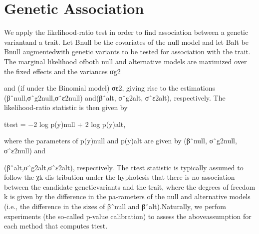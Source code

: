 \section{Genetic Association}

We apply the likelihood-ratio test in order to find association between a genetic variantand a trait. Let Bnull be the covariates of the null model and let Balt be Bnull augmentedwith genetic variants to be tested for association with the trait. The marginal likelihood ofboth null and alternative models are maximized over the fixed effects and the variances σg2

and (if under the Binomial model) σε2, giving rise to the estimations (βˆnull,σˆg2null,σˆε2null) and(βˆalt, σˆg2alt, σˆε2alt), respectively. The likelihood-ratio statistic is then given by
\begin{*align}
ttest = −2 log p(y)null + 2 log p(y)alt,
\end{*align}
where the parameters of p(y)null and p(y)alt are given by (βˆnull, σˆg2null, σˆε2null) and

(βˆalt,σˆg2alt,σˆε2alt),
respectively. The ttest statistic is typically assumed to follow the χk dis-tribution under the hyphotesis that there is no association between the candidate geneticvariants and the trait, where the degrees of freedom k is given by the difference in the pa-rameters of the null and alternative models (i.e., the difference in the sizes of βˆnull and βˆalt).Naturally, we perfom experiments (the so-called p-value calibration) to assess the aboveassumption for each method that computes ttest.
